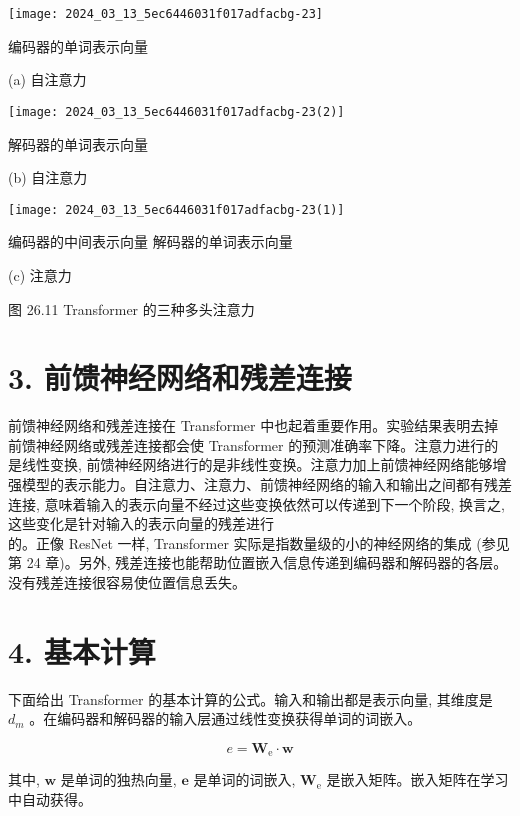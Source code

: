 \documentclass[10pt]{article}
\begin{document}
\begin{center}
\texttt{[image: 2024\_03\_13\_5ec6446031f017adfacbg-23]}
\end{center}

编码器的单词表示向量

(a) 自注意力

\begin{center}
\texttt{[image: 2024\_03\_13\_5ec6446031f017adfacbg-23(2)]}
\end{center}

解码器的单词表示向量

(b) 自注意力

\begin{center}
\texttt{[image: 2024\_03\_13\_5ec6446031f017adfacbg-23(1)]}
\end{center}

编码器的中间表示向量 解码器的单词表示向量

(c) 注意力

图 26.11 Transformer 的三种多头注意力

\section*{3. 前馈神经网络和残差连接}
前馈神经网络和残差连接在 Transformer 中也起着重要作用。实验结果表明去掉前馈神经网络或残差连接都会使 Transformer 的预测准确率下降。注意力进行的是线性变换, 前馈神经网络进行的是非线性变换。注意力加上前馈神经网络能够增强模型的表示能力。自注意力、注意力、前馈神经网络的输入和输出之间都有残差连接, 意味着输入的表示向量不经过这些变换依然可以传递到下一个阶段, 换言之, 这些变化是针对输入的表示向量的残差进行\\
的。正像 ResNet 一样, Transformer 实际是指数量级的小的神经网络的集成 (参见第 24 章)。另外, 残差连接也能帮助位置嵌入信息传递到编码器和解码器的各层。没有残差连接很容易使位置信息丢失。

\section*{4. 基本计算}
下面给出 Transformer 的基本计算的公式。输入和输出都是表示向量, 其维度是 $d_{m}$ 。在编码器和解码器的输入层通过线性变换获得单词的词嵌入。


\begin{equation*}
e=\boldsymbol{W}_{\mathrm{e}} \cdot \boldsymbol{w} \tag{26.26}
\end{equation*}


其中, $\boldsymbol{w}$ 是单词的独热向量, $\boldsymbol{e}$ 是单词的词嵌入, $\boldsymbol{W}_{\mathrm{e}}$ 是嵌入矩阵。嵌入矩阵在学习中自动获得。
\end{document}

